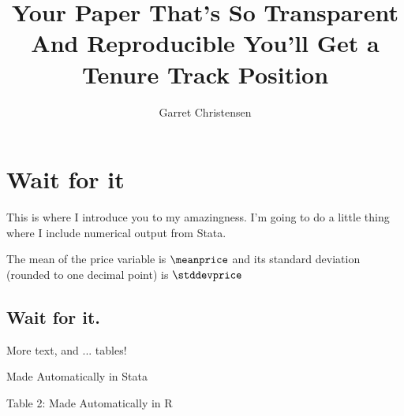 \documentclass[11pt]{article} %
\title{Your Paper That's So Transparent And Reproducible You'll Get a Tenure Track Position}
\author{Garret Christensen}
\begin{document}

\maketitle

\section{Wait for it}

This is where I introduce you to my amazingness.
I'm going to do a little thing where I include numerical output from Stata.

The mean of the price variable is $\meanprice$ and its standard deviation (rounded to one decimal point) is $\stddevprice$

\subsection{Wait for it.}

More text, and ... tables! 

\begin{table}
\caption{Made Automatically in Stata}

\end{table}


 Table 2: Made Automatically in R
\end{document}
